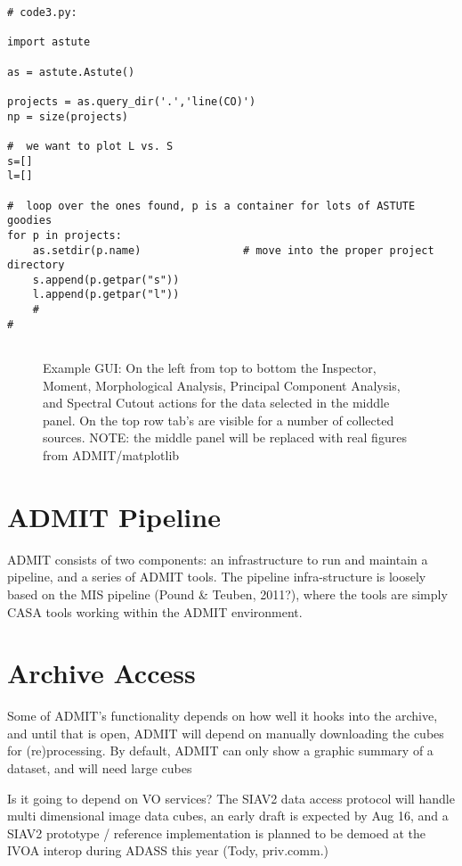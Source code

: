 \documentclass[preprint]{aastex} %
\begin{document}
\footnotesize
\begin{verbatim}
# code3.py:

import astute

as = astute.Astute()

projects = as.query_dir('.','line(CO)')
np = size(projects)

#  we want to plot L vs. S
s=[]
l=[]

#  loop over the ones found, p is a container for lots of ASTUTE goodies
for p in projects:
    as.setdir(p.name)                # move into the proper project directory
    s.append(p.getpar("s"))
    l.append(p.getpar("l"))
    #
#


\end{verbatim}
\normalsize


\begin{figure}[ht]
\caption{Example GUI: On the left from top to bottom the Inspector, Moment, 
Morphological Analysis, Principal Component Analysis, and Spectral Cutout
actions for the data selected in the middle panel. On the top row tab's are
visible for a number of collected sources. NOTE: the middle panel will be replaced
with real figures from ADMIT/matplotlib}
\label{fig:gui1}
\end{figure}



\section{ADMIT Pipeline}


ADMIT consists of two components: an infrastructure to run
and maintain a pipeline, and a series of ADMIT tools. The pipeline
infra-structure is loosely based on the MIS pipeline (Pound \& Teuben, 2011?),
where the tools are simply CASA tools working within the ADMIT environment.


\section{Archive Access}

Some of ADMIT's functionality depends on how well it hooks into the archive,
and until that is open, ADMIT will depend on manually downloading the cubes
for (re)processing.  By default, ADMIT can only show a graphic summary of
a dataset, and will need large cubes

Is it going to depend on VO services? The SIAV2 data access protocol
will handle multi dimensional image data cubes, an early draft is expected
by Aug 16, and a SIAV2 prototype / reference implementation is planned to 
be demoed at the IVOA interop during ADASS this year (Tody, priv.comm.)
\end{document}

